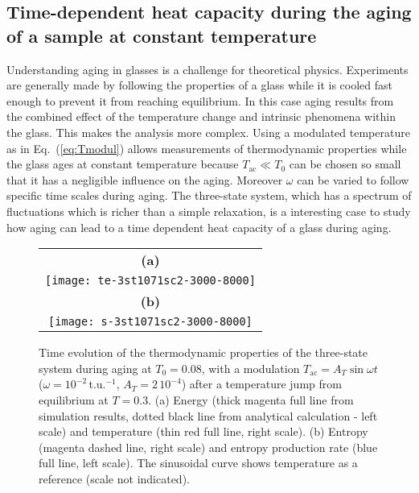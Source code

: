 \documentclass[pre,a4paper,twocolumn,superscriptaddress,%
floatfix]{revtex4}
\newcommand{\tac}{\ensuremath{T_{\mathrm{ac}}}}
\newcommand{\dtac}{\ensuremath{A_T}}
\begin{document}
\subsection{Time-dependent heat capacity during the aging of a sample at
  constant temperature}
\label{sec:aging}

Understanding aging in glasses is a challenge for theoretical
physics. Experiments are generally made by following the properties of a glass
while it is cooled fast enough to prevent it from reaching
equilibrium. In this case aging results from the combined effect of the
temperature change and intrinsic phenomena within the glass. This
makes the analysis more complex.
Using a modulated temperature as in
Eq.~(\ref{eq:Tmodul}) allows measurements of thermodynamic
properties while the glass ages at constant temperature because
$\tac \ll T_0$ can be chosen so small that it has a negligible influence on
the aging. Moreover $\omega$ can be varied to follow specific time scales
during aging. The three-state system, which has a spectrum of
fluctuations which is richer than a simple relaxation, is a interesting case
to study how aging can lead to a time dependent heat capacity of a glass
during aging.

\smallskip
\begin{figure}[h]
  \centering
  \begin{tabular}{c}
    \textbf{(a)} \\
    \texttt{[image: te-3st1071sc2-3000-8000]} \\
     \textbf{(b)}\vspace{-0.4cm} \\
    \texttt{[image: s-3st1071sc2-3000-8000]}
  \end{tabular}
  \caption{Time evolution of the thermodynamic properties of the three-state
    system during aging at $T_0 = 0.08$, with a modulation
    $\tac = \dtac \sin \omega t$ ($\omega = 10^{-2}\,$t.u.$^{-1}$,
    $\dtac = 2\,10^{-4}$) after a temperature jump from
    equilibrium at $T=0.3$. (a) Energy (thick magenta full line
    from simulation results, dotted black line
    from analytical calculation - left scale) and temperature
    (thin red full line, right
  scale). (b) Entropy (magenta dashed line, right scale)
  and entropy production rate (blue full line,
  left scale). The sinusoidal curve shows temperature as
  a reference (scale not indicated). }
  \label{fig:aging1071}
\end{figure}
\medskip
\end{document}
